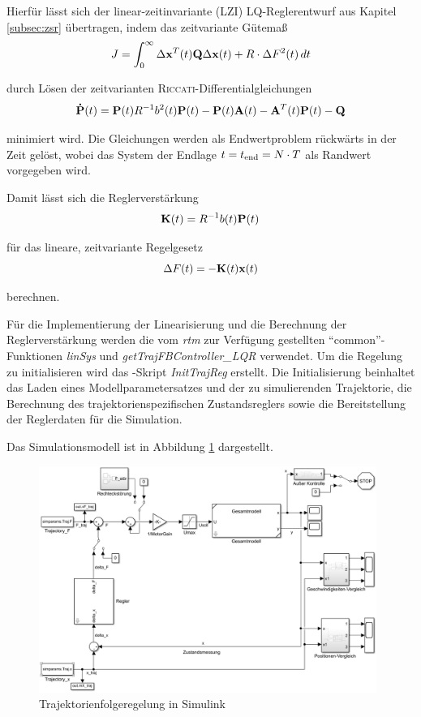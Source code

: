 Hierfür lässt sich der linear-zeitinvariante (LZI) LQ-Reglerentwurf aus Kapitel \ref{subsec:zsr} übertragen, indem das zeitvariante Gütemaß 
	\[
	J = \int_{0}^{\infty} \Delta \boldsymbol{\mathrm{x}}^T(t) {\boldsymbol{\mathrm{Q}}} \Delta \boldsymbol{\mathrm{x}}(t) + R \cdot \Delta F^2(t) \, dt
\]

durch Lösen der zeitvarianten \textsc{Riccati}-Differentialgleichungen
	\[
	{\boldsymbol{\mathrm{\dot{P}}}}(t) = {\boldsymbol{\mathrm{P}}}(t) R^{-1} b^2(t) {\boldsymbol{\mathrm{P}}}(t) - {\boldsymbol{\mathrm{P}}}(t) {\boldsymbol{\mathrm{A}}}(t) - {\boldsymbol{\mathrm{A}}}^T(t) {\boldsymbol{\mathrm{P}}}(t) - {\boldsymbol{\mathrm{Q}}}
\]

minimiert wird. Die Gleichungen werden als Endwertproblem rückwärts in der Zeit gelöst, wobei das System der Endlage $t=t_{\mathrm{end}} = N \cdot T$ als Randwert vorgegeben wird. 

Damit lässt sich die Reglerverstärkung 
	\[
	{\boldsymbol{\mathrm{K}}}(t) = R^{-1} b(t) {\boldsymbol{\mathrm{P}}}(t)
\]

für das lineare, zeitvariante Regelgesetz
	\[
	\Delta F(t) = -{\boldsymbol{\mathrm{K}}}(t) \boldsymbol{\mathrm{x}}(t)
\]

berechnen.

Für die Implementierung der Linearisierung und die Berechnung der Reglerverstärkung werden die vom \emph{rtm} zur Verfügung gestellten "`common"'-Funktionen \textit{linSys} und \textit{getTrajFBController\_LQR} verwendet. Um die Regelung zu initialisieren wird das \Matlab-Skript \textit{InitTrajReg} erstellt. Die Initialisierung beinhaltet das Laden eines Modellparametersatzes und der zu simulierenden Trajektorie, die Berechnung des trajektorienspezifischen Zustandsreglers sowie die Bereitstellung der Reglerdaten für die Simulation. 

Das Simulationsmodell ist in Abbildung \ref{fig:TFR_Simulink} dargestellt.

\begin{figure}[h]
	\centering
		\includegraphics[width=0.98\textwidth]{Bilder/Trajektorien/TFR_Simulink.PNG}
	\caption{Trajektorienfolgeregelung in Simulink}
	\label{fig:TFR_Simulink}
\end{figure}

